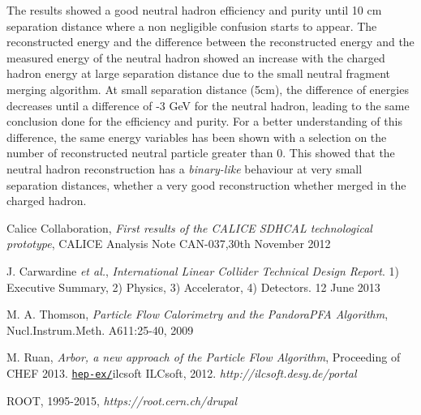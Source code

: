 \documentclass[cits]{JINST}
\begin{document}
The results showed a good neutral hadron efficiency and purity until 10 cm separation distance where a non negligible confusion starts to appear. The reconstructed energy and the difference between the reconstructed energy and the measured energy of the neutral hadron showed an increase with the charged hadron energy at large separation distance due to the small neutral fragment merging algorithm. At small separation distance (5cm), the difference of energies decreases until a difference of -3 GeV for the neutral hadron, leading to the same conclusion done for the efficiency and purity. For a better understanding of this difference, the same energy variables has been shown with a selection on the number of reconstructed neutral particle greater than 0. This showed that the neutral hadron reconstruction has a \textit{binary-like} behaviour at very small separation distances, whether a very good reconstruction whether merged in the charged hadron.

\newpage
\begin{thebibliography}{6}
\renewcommand{\hepex}[1]{\href{http://www.arxiv.org/abs/#1}{\tt hep-ex/#1}}
\renewcommand{\physics}[1]{\href{http://www.arxiv.org/abs/#1}{\tt phys.int-det/#1}}
\newcommand\nim[4]{\href{http://dx.doi.org/10.1016/#4}
  {\emph{Nucl.\ Instrum.\ Meth.} {\bf #1} (#2) #3}}


Calice Collaboration, \emph{First results of the CALICE SDHCAL technological prototype}, CALICE Analysis Note CAN-037,30th November 2012


J. Carwardine {\it et al.},  \emph{International Linear Collider Technical Design Report}. 1) Executive Summary, 2) Physics, 3) Accelerator, 4) Detectors. 12 June 2013


M. A. Thomson, \emph{Particle Flow Calorimetry and the PandoraPFA Algorithm}, Nucl.Instrum.Meth. A611:25-40, 2009


M. Ruan, \emph{Arbor, a new approach of the Particle Flow Algorithm}, Proceeding of CHEF 2013. \hepex


\bibitem{ilcsoft}
ILCsoft, 2012. \textit{http://ilcsoft.desy.de/portal}


ROOT, 1995-2015, \textit{https://root.cern.ch/drupal}

\newpage

\end{thebibliography}


\clearpage
\appendix
\end{document}
